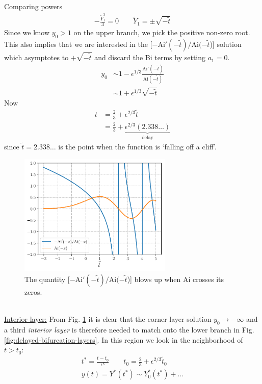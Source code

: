 Comparing powers
\begin{align*}
	-\frac{\tilde{Y}_1^3}{3} = 0 \qquad 
	 \tilde{Y}_1=\pm \sqrt{-\tilde{t}}
\end{align*}
Since we know $y_0>1$ on the upper branch, we pick the positive non-zero root. This also implies that we are interested in the [$-\mathrm{Ai}'(-\tilde{t})/\mathrm{Ai}(-\tilde{t}$)] solution which asymptotes to $+\sqrt{-\tilde{t}}$ and discard the Bi terms by setting $a_1=0$.
\begin{align*}
	y_0 &\sim 1 - \epsilon^{1/3} \frac{\mathrm{Ai}'(-\tilde{t})}{\mathrm{Ai}(-\tilde{t})} \\
	&\sim 1 + \epsilon^{1/3} \sqrt{-\tilde{t}}
\end{align*}
Now
\begin{align*}
t &= \frac{2}{3} + \epsilon^{2/3} \tilde{t} \\
&=\frac{2}{3} + \underbrace{\epsilon^{2/3} (2.338\dots )}_\text{delay} 
\end{align*}
since $\tilde{t}=2.338\dots $ is the point when the function is `falling off a cliff'.
\begin{figure}[!h]
	\centering
	\includegraphics[width=0.65\textwidth]{./plots/pdf/strogatz-wk21-aip_ai.pdf}
	\caption{The quantity [$-\mathrm{Ai}'(-\tilde{t})/\mathrm{Ai}(-\tilde{t}$)] blows up when Ai crosses its zeros.}
	\label{fig:strogatz-wk21-aip_ai}
\end{figure}\\
\underline{Interior layer:} From Fig. \ref{fig:strogatz-wk21-aip_ai} it is clear that the corner layer solution $y_0 \rightarrow -\infty$ and a third \emph{interior layer} is therefore needed to match onto the lower branch in Fig. \ref{fig:delayed-bifurcation-layers}. In this region we look in the neighborhood of $t>t_0$:
\begin{align*}
	t^\ast = \frac{t-t_0}{\epsilon^\kappa} \qquad t_0 = \frac{2}{3} + \epsilon^{2/3}\tilde{t}_0 \\
	y(t) = Y^\ast (t^\ast) \sim Y_0^\ast (t^\ast ) + \dots 
\end{align*}
